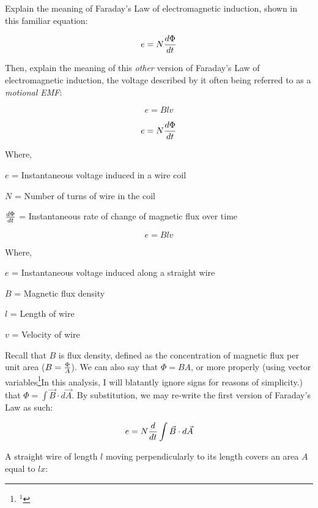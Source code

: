 

Explain the meaning of Faraday's Law of electromagnetic induction, shown in this familiar equation:

$$e = N {d \Phi \over dt}$$

Then, explain the meaning of this {\it other} version of Faraday's Law of electromagnetic induction, the voltage described by it often being referred to as a {\it motional EMF}:

$$e = Blv$$







$$e = N {d \Phi \over dt}$$

\noindent
Where,

$e$ = Instantaneous voltage induced in a wire coil

$N$ = Number of turns of wire in the coil

$d \Phi \over dt$ = Instantaneous rate of change of magnetic flux over time

\vskip 20pt

$$e = Blv$$

\noindent
Where,

$e$ = Instantaneous voltage induced along a straight wire

$B$ = Magnetic flux density

$l$ = Length of wire

$v$ = Velocity of wire







Recall that $B$ is flux density, defined as the concentration of magnetic flux per unit area ($B = {\Phi \over A}$).  We can also say that $\Phi = B A$, or more properly (using vector variables\footnote{$^{1}$}{In this analysis, I will blatantly ignore signs for reasons of simplicity.}) that $\Phi = \int \vec B \cdot d \vec A$.  By substitution, we may re-write the first version of Faraday's Law as such:

$$e = N {d \over dt} \int \vec B \cdot d \vec A$$

A straight wire of length $l$ moving perpendicularly to its length covers an area $A$ equal to $lx$:

